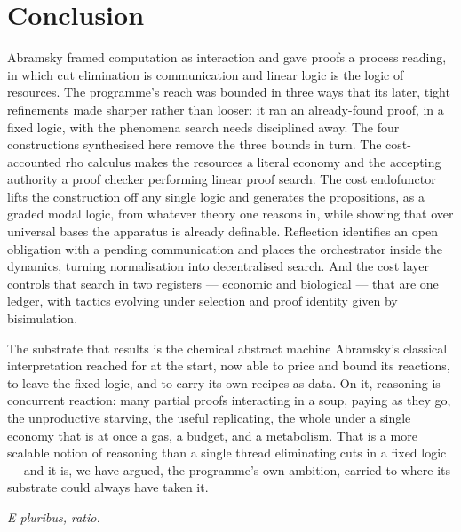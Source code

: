 \documentclass[11pt]{article}
\theoremstyle{definition}
\theoremstyle{plain}
\begin{document}
\section{Conclusion}\label{sec:conclusion}

Abramsky framed computation as interaction and gave proofs a process reading, in
which cut elimination is communication and linear logic is the logic of
resources. The programme's reach was bounded in three ways that its later, tight
refinements made sharper rather than looser: it ran an already-found proof, in a
fixed logic, with the phenomena search needs disciplined away. The four
constructions synthesised here remove the three bounds in turn. The
cost-accounted rho calculus makes the resources a literal economy and the
accepting authority a proof checker performing linear proof search. The cost
endofunctor lifts the construction off any single logic and generates the
propositions, as a graded modal logic, from whatever theory one reasons in,
while showing that over universal bases the apparatus is already definable.
Reflection identifies an open obligation with a pending communication and places
the orchestrator inside the dynamics, turning normalisation into decentralised
search. And the cost layer controls that search in two registers --- economic and
biological --- that are one ledger, with tactics evolving under selection and
proof identity given by bisimulation.

The substrate that results is the chemical abstract machine Abramsky's classical
interpretation reached for at the start, now able to price and bound its
reactions, to leave the fixed logic, and to carry its own recipes as data. On
it, reasoning is concurrent reaction: many partial proofs interacting in a soup,
paying as they go, the unproductive starving, the useful replicating, the whole
under a single economy that is at once a gas, a budget, and a metabolism. That
is a more scalable notion of reasoning than a single thread eliminating cuts in a
fixed logic --- and it is, we have argued, the programme's own ambition, carried
to where its substrate could always have taken it.

\begin{center}\itshape E pluribus, ratio.\end{center}
\end{document}
